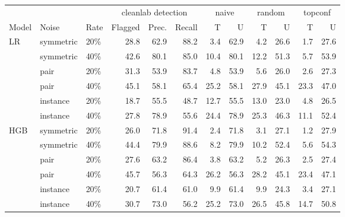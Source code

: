 \begin{tabular}{lllrrrrrrrrr}
\toprule
 & & & \multicolumn{3}{c}{cleanlab detection} & \multicolumn{2}{c}{naive} & \multicolumn{2}{c}{random} & \multicolumn{2}{c}{topconf} \\
\cmidrule(lr){4-6} \cmidrule(lr){7-8} \cmidrule(lr){9-10} \cmidrule(lr){11-12}
Model & Noise & Rate & Flagged & Prec. & Recall & T & U & T & U & T & U \\
\midrule
LR & symmetric & 20\% & 28.8 & 62.9 & 88.2 & 3.4 & 62.9 & 4.2 & 26.6 & 1.7 & 27.6 \\
 & symmetric & 40\% & 42.6 & 80.1 & 85.0 & 10.4 & 80.1 & 12.2 & 51.3 & 5.7 & 53.9 \\
 & pair & 20\% & 31.3 & 53.9 & 83.7 & 4.8 & 53.9 & 5.6 & 26.0 & 2.6 & 27.3 \\
 & pair & 40\% & 45.1 & 58.1 & 65.4 & 25.2 & 58.1 & 27.9 & 45.1 & 23.3 & 47.0 \\
 & instance & 20\% & 18.7 & 55.5 & 48.7 & 12.7 & 55.5 & 13.0 & 23.0 & 4.8 & 26.5 \\
 & instance & 40\% & 27.8 & 78.9 & 55.6 & 24.4 & 78.9 & 25.3 & 46.3 & 11.1 & 52.4 \\
\addlinespace
HGB & symmetric & 20\% & 26.0 & 71.8 & 91.4 & 2.4 & 71.8 & 3.1 & 27.1 & 1.2 & 27.9 \\
 & symmetric & 40\% & 44.4 & 79.9 & 88.6 & 8.2 & 79.9 & 10.2 & 52.4 & 5.6 & 54.3 \\
 & pair & 20\% & 27.6 & 63.2 & 86.4 & 3.8 & 63.2 & 5.2 & 26.3 & 2.5 & 27.4 \\
 & pair & 40\% & 45.7 & 56.3 & 64.3 & 26.2 & 56.3 & 28.2 & 45.1 & 23.4 & 47.1 \\
 & instance & 20\% & 20.7 & 61.4 & 61.0 & 9.9 & 61.4 & 9.9 & 24.3 & 3.4 & 27.1 \\
 & instance & 40\% & 30.7 & 73.0 & 56.2 & 25.2 & 73.0 & 26.5 & 45.8 & 14.7 & 50.8 \\
\bottomrule
\end{tabular}
